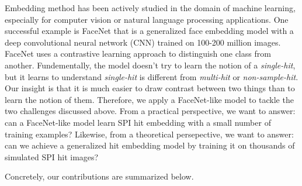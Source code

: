 Embedding method has been actively studied in the domain of machine learning,
especially for computer vision or natural language processing applications.  One
successful example is FaceNet \cite{schroffFaceNetUnifiedEmbedding2015} that is
a generalized face embedding model with a deep convolutional neural network (CNN)
trained on 100-200 million images.  FaceNet uses a contrastive learning approach
to distinguish one class from another.  Fundementally, the model doesn't try to
learn the notion of a \textit{single-hit}, but it learns to understand
\textit{single-hit} is different from \textit{multi-hit} or
\textit{non-sample-hit}.  Our insight is that it is much easier to draw contrast
between two things than to learn the notion of them.  Therefore, we apply a
FaceNet-like model to tackle the two challenges discussed above.  From a
practical perspective, we want to answer: can a FaceNet-like model learn SPI hit
embedding with a small number of training examples?  Likewise, from a
theoretical persepective, we want to answer: can we achieve a generalized hit
embedding model by training it on thousands of simulated SPI hit images?  



Concretely, our contributions are summarized below.  

